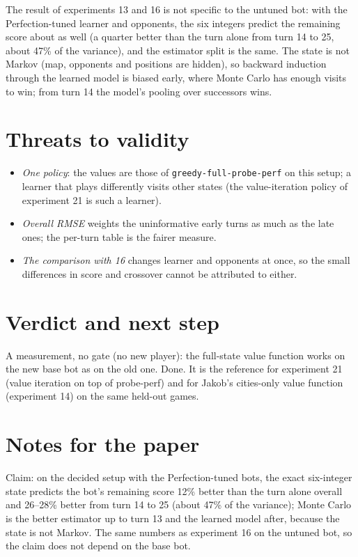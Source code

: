 \documentclass{../polyexp}
\begin{document}
The result of experiments 13 and 16 is not specific to the untuned bot: with the Perfection-tuned learner and
opponents, the six integers predict the remaining score about as well (a quarter better than the turn alone from
turn 14 to 25, about 47\% of the variance), and the estimator split is the same. The state is not Markov (map,
opponents and positions are hidden), so backward induction through the learned model is biased early, where Monte
Carlo has enough visits to win; from turn 14 the model's pooling over successors wins.


\section{Threats to validity}
\begin{itemize}
  \item \emph{One policy}: the values are those of \texttt{greedy-full-probe-perf} on this setup; a learner that
        plays differently visits other states (the value-iteration policy of experiment 21 is such a learner).
  \item \emph{Overall RMSE} weights the uninformative early turns as much as the late ones; the per-turn table is the
        fairer measure.
  \item \emph{The comparison with 16} changes learner and opponents at once, so the small differences in score and
        crossover cannot be attributed to either.
\end{itemize}

\section{Verdict and next step}
A measurement, no gate (no new player): the full-state value function works on the new base bot as on the old one.
Done. It is the reference for experiment 21 (value iteration on top of probe-perf) and for Jakob's cities-only
value function (experiment 14) on the same held-out games.

\section{Notes for the paper}
Claim: on the decided setup with the Perfection-tuned bots, the exact six-integer state predicts the bot's remaining
score 12\% better than the turn alone overall and 26--28\% better from turn 14 to 25 (about 47\% of the variance);
Monte Carlo is the better estimator up to turn 13 and the learned model after, because the state is not Markov. The
same numbers as experiment 16 on the untuned bot, so the claim does not depend on the base bot.

\end{document}
